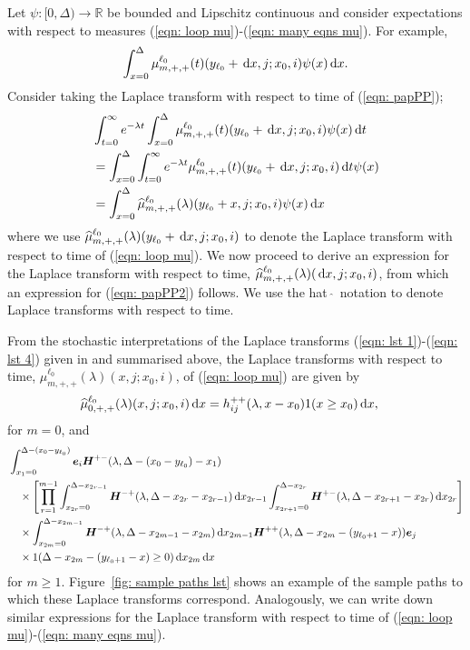 Let \(\psi:[0,\Delta)\to\mathbb R\) be bounded and Lipschitz continuous and consider expectations with respect to measures (\ref{eqn: loop mu})-(\ref{eqn: many eqns mu}). For example, 
\begin{align}
	\int_{x=0}^\Delta \mu^{\ell_0}_{m,+,+}(t)( y_{\ell_0} + \, \mathrm{d} x, j; x_0,i) \psi(x)\, \mathrm{d} x. \label{eqn: papPP}
\end{align}
Consider taking the Laplace transform with respect to time of (\ref{eqn: papPP});
\begin{align}
	&\int_{t=0}^\infty e^{-\lambda t}\int_{x=0}^\Delta \mu^{\ell_0}_{m,+,+}(t)( y_{\ell_0} + \, \mathrm{d} x, j; x_0,i) \psi(x) \, \mathrm{d} t \nonumber 
	\\&= \int_{x=0}^\Delta \int_{t=0}^\infty e^{-\lambda t} \mu^{\ell_0}_{m,+,+}(t)( y_{\ell_0} + \, \mathrm{d} x, j; x_0,i)  \, \mathrm{d} t \psi(x) \nonumber 
	\\&= \int_{x=0}^\Delta \widehat \mu^{\ell_0}_{m,+,+}(\lambda)( y_{\ell_0} + x, j; x_0,i) \psi(x) \, \mathrm{d} x \label{eqn: papPP2}
\end{align}
where we use \(\widehat \mu^{\ell_0}_{m,+,+}(\lambda)( y_{\ell_0} + \, \mathrm{d} x, j; x_0,i) \) to denote the Laplace transform with respect to time of (\ref{eqn: loop mu}). We now proceed to derive an expression for the Laplace transform with respect to time, \(\widehat \mu^{\ell_0}_{m,+,+}(\lambda)( \, \mathrm{d} x, j; x_0,i) \), from which an expression for (\ref{eqn: papPP2}) follows. We use the hat \(\,\widehat{}\,\)  notation to denote Laplace transforms with respect to time. 

From the stochastic interpretations of the Laplace transforms (\ref{eqn: lst 1})-(\ref{eqn: lst 4}) given in \citep{bean2005} and summarised above, the Laplace transforms with respect to time, \(\widehat \mu^{\ell_0}_{m,+,+}(\lambda)( x, j; x_0,i)\), of (\ref{eqn: loop mu}) are given by 
\begin{align*}
	\widehat \mu^{\ell_0}_{0,+,+}(\lambda)( x,j;x_0,i) \, \mathrm{d} x&= h_{ij}^{++}(\lambda,x-x_0)1(x\geq x_0)\, \mathrm{d} x,
\end{align*}
for \(m=0\),  and 
\begin{align}
	\nonumber&\int_{x_1 = 0}^{\Delta-(x_0-y_{\ell_0})} \bs e_i \bs H^{+-}(\lambda,\Delta-(x_0-y_{\ell_0})-x_1)  %
	\\& \quad \nonumber\times\left[\prod_{r=1}^{m-1} \int_{x_{2r}=0}^{\Delta-x_{2r-1}} \bs H^{-+}(\lambda,\Delta-x_{2r}-x_{2r-1})\wrt x_{2r-1}\int_{x_{2r+1}=0}^{\Delta-x_{2r}}\bs H^{+-}(\lambda,\Delta-x_{2r+1}-x_{2r})\wrt x_{2r}\right]
	\\&\quad\times \int_{x_{2m}=0}^{\Delta-x_{2m-1}} \bs H^{-+}(\lambda,\Delta -x_{2m-1} - x_{2m}) \wrt x_{2m-1}\bs H^{++}(\lambda,\Delta -x_{2m}- (y_{\ell_0+1}- x))\bs e_j \nonumber	
	\\&\quad\times 1(\Delta-x_{2m}-(y_{\ell_0+1}-x)\geq 0)\wrt x_{2m} \wrt x \label{eqn: lst herwe}
\end{align} 
for \(m\geq 1\). Figure~\ref{fig: sample paths lst} shows an example of the sample paths to which these Laplace transforms correspond.  Analogously, we can write down similar expressions for the Laplace transform with respect to time of (\ref{eqn: loop mu})-(\ref{eqn: many eqns mu}). 

